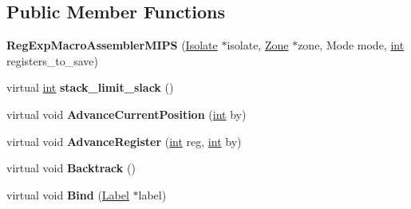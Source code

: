 \subsection*{Public Member Functions}
\begin{DoxyCompactItemize}
\item 
\mbox{\label{classv8_1_1internal_1_1RegExpMacroAssemblerMIPS_aa6806a1e3af86ec20cc1077c01607b24}} 
{\bfseries Reg\+Exp\+Macro\+Assembler\+M\+I\+PS} (\mbox{\hyperlink{classv8_1_1internal_1_1Isolate}{Isolate}} $\ast$isolate, \mbox{\hyperlink{classv8_1_1internal_1_1Zone}{Zone}} $\ast$zone, Mode mode, \mbox{\hyperlink{classint}{int}} registers\+\_\+to\+\_\+save)
\item 
\mbox{\label{classv8_1_1internal_1_1RegExpMacroAssemblerMIPS_ade29d0ccd6722e1078ec888188917f9d}} 
virtual \mbox{\hyperlink{classint}{int}} {\bfseries stack\+\_\+limit\+\_\+slack} ()
\item 
\mbox{\label{classv8_1_1internal_1_1RegExpMacroAssemblerMIPS_a8b46dd14d6be7b20399d60416582b610}} 
virtual void {\bfseries Advance\+Current\+Position} (\mbox{\hyperlink{classint}{int}} by)
\item 
\mbox{\label{classv8_1_1internal_1_1RegExpMacroAssemblerMIPS_a9ab2276500b78ea3c12268dd9bb4ba7c}} 
virtual void {\bfseries Advance\+Register} (\mbox{\hyperlink{classint}{int}} reg, \mbox{\hyperlink{classint}{int}} by)
\item 
\mbox{\label{classv8_1_1internal_1_1RegExpMacroAssemblerMIPS_adfe2e4c2ea84a1ab5ad151218f899ded}} 
virtual void {\bfseries Backtrack} ()
\item 
\mbox{\label{classv8_1_1internal_1_1RegExpMacroAssemblerMIPS_ac4858be1e00e71c992e568de14abe61a}} 
virtual void {\bfseries Bind} (\mbox{\hyperlink{classv8_1_1internal_1_1Label}{Label}} $\ast$label)
\item 
\mbox{\label{classv8_1_1internal_1_1RegExpMacroAssemblerMIPS_a0f87ac84fa8e60eeafa27e85b258b6ab}} 

\end{DoxyCompactItemize}
